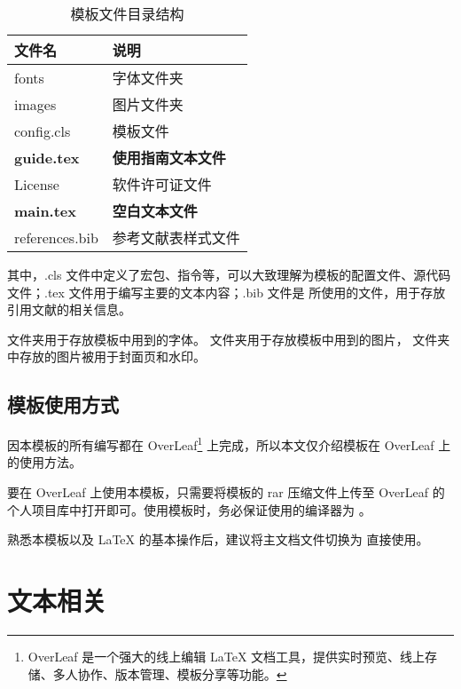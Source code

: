 \documentclass[report, twoside, UTF8, AutoFakeBold = 1, AutoFakeSlant, zihao = -4]{config}
\begin{document}
\begin{table}
  \centering
  \caption{模板文件目录结构}
  \label{tab:文件目录}
  \setlength{\tabcolsep}{30pt} %
  \begin{tabular}{ll}
    \toprule[1.5pt]
    \textbf{文件名}           & \textbf{说明}\\
    \midrule[0.8pt]
    fonts                    & 字体文件夹\\
    images                   & 图片文件夹\\
    config.cls               & 模板文件\\
    \textbf{guide.tex}       & \textbf{使用指南文本文件}\\
    License                  & 软件许可证文件\\
    \textbf{main.tex}        & \textbf{空白文本文件}\\
    references.bib           & 参考文献表样式文件\\
    \bottomrule[1.5pt]
  \end{tabular}
\end{table}

其中，.cls 文件中定义了宏包、指令等，可以大致理解为模板的配置文件、源代码文件；.tex 文件用于编写主要的文本内容；.bib 文件是  所使用的文件，用于存放引用文献的相关信息。

 文件夹用于存放模板中用到的字体。 文件夹用于存放模板中用到的图片， 文件夹中存放的图片被用于封面页和水印。

\section{模板使用方式}

因本模板的所有编写都在 OverLeaf\footnote{OverLeaf 是一个强大的线上编辑 \LaTeX{} 文档工具，提供实时预览、线上存储、多人协作、版本管理、模板分享等功能。} 上完成，所以本文仅介绍模板在 OverLeaf 上的使用方法。

要在 OverLeaf 上使用本模板，只需要将模板的 rar 压缩文件上传至 OverLeaf 的个人项目库中打开即可。使用模板时，务必保证使用的编译器为 。

熟悉本模板以及 \LaTeX{} 的基本操作后，建议将主文档文件切换为  直接使用。

\chapter{文本相关}
\end{document}
